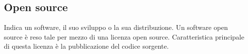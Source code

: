 \section{}
\subsection*{Open source} Indica un software, il suo sviluppo o la sua distribuzione. Un software open source è reso tale per mezzo di una licenza open source. Caratteristica principale di questa licenza è la pubblicazione del codice sorgente.